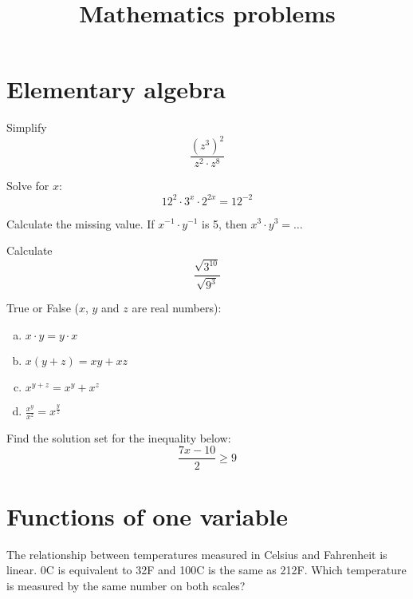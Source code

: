 \documentclass[10pt]{article}
\newenvironment{problem}[2][Problem]{\begin{trivlist}
\item[\hskip \labelsep {\bfseries #1}\hskip \labelsep {\bfseries #2.}]}{\end{trivlist}}
\begin{document}
 
\title{Mathematics problems}
\date{}
\maketitle

 \section{Elementary algebra}
 
\begin{problem}{1.1}
Simplify $$\frac{(z^{3})^2}{z^2 \cdot z^8}$$
\end{problem}

\begin{problem}{1.2}
Solve for $x$:
$$12^2 \cdot 3^x \cdot 2^{2x} = 12^{-2}$$
\end{problem}

\begin{problem}{1.3}
Calculate the missing value. If $x^{-1} \cdot y^{-1}$ is 5, then $x^{3} \cdot y^{3}=\dots$
\end{problem}

\begin{problem}{1.4}
Calculate
$$\frac{\sqrt{3^{10}}}{\sqrt{9^3}}$$
\end{problem}

\begin{problem}{1.5}
True or False ($x$, $y$ and $z$ are real numbers):
\begin{enumerate}[(a)]
    \item $x \cdot y=y \cdot x$
    \item $x(y+z)=xy+xz$
    \item $x^{y+z}=x^y+x^z$
    \item $\frac{x^y}{x^z}=x^{\frac{y}{z}}$
\end{enumerate}
\end{problem}

\begin{problem}{1.6}
Find the solution set for the inequality below:
$$\frac{7x-10}{2}\ge9$$
\end{problem}

\section{Functions of one variable}

\begin{problem}{2.1 (Based on SYD 2.5.6)}
The relationship between temperatures measured in Celsius and Fahrenheit is linear. 0\degree C is equivalent to 32\degree F and 100\degree C is the same as 212\degree F.
 Which temperature is measured by the same number on both scales?
\end{problem}
\end{document}
